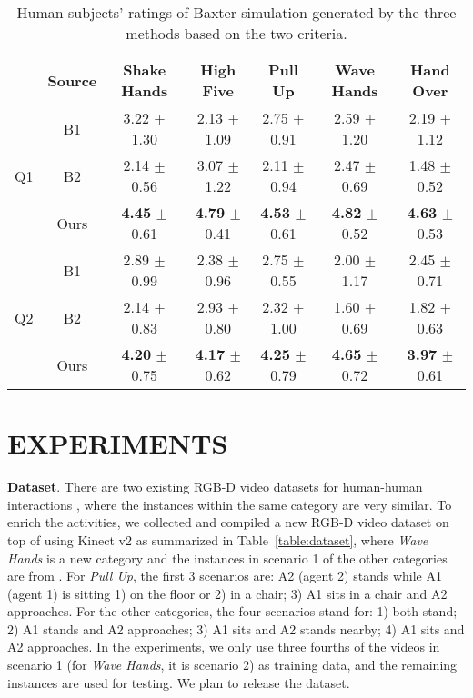 \documentclass[letterpaper, 10 pt, conference]{ieeeconf}  %
\begin{document}
\begin{table}[t!]\scriptsize
\caption{Human subjects' ratings of Baxter simulation generated by the three methods based on the two criteria.}
\label{table:ratings}
\vspace{-5pt}
\centering
\tabcolsep=0.08cm
\begin{tabular}{c|c|c|c|c|c|c} \hline
 & Source   & Shake Hands & High Five & Pull Up & Wave Hands & Hand Over \\ \hline
\multirow{3}{*}{Q1} & B1 & 3.22 $\pm$ 1.30 &  2.13 $\pm$ 1.09 & 2.75 $\pm$ 0.91 &  2.59 $\pm$ 1.20 & 2.19 $\pm$ 1.12    \\ \cline{2-7}
 & B2 & 2.14 $\pm$ 0.56 &  3.07 $\pm$ 1.22  & 2.11 $\pm$ 0.94 &  2.47 $\pm$ 0.69 & 1.48 $\pm$ 0.52   \\ \cline{2-7}
  & Ours & \textbf{4.45} $\pm$ 0.61 & \textbf{4.79} $\pm$ 0.41 & \textbf{4.53} $\pm$ 0.61 &  \textbf{4.82} $\pm$ 0.52 & \textbf{4.63} $\pm$ 0.53   \\ \hline
\multirow{3}{*}{Q2}  & B1 & 2.89 $\pm$ 0.99 &  2.38 $\pm$ 0.96  & 2.75 $\pm$ 0.55 &  2.00 $\pm$ 1.17 & 2.45 $\pm$ 0.71 \\ \cline{2-7}
 & B2 & 2.14 $\pm$ 0.83 & 2.93 $\pm$ 0.80 & 2.32 $\pm$ 1.00 & 1.60 $\pm$ 0.69 & 1.82 $\pm$ 0.63 \\ \cline{2-7}
  & Ours  & \textbf{4.20} $\pm$ 0.75 & \textbf{4.17} $\pm$ 0.62 & \textbf{4.25} $\pm$ 0.79 &  \textbf{4.65} $\pm$ 0.72 &   \textbf{3.97} $\pm$ 0.61   \\ \hline
\end{tabular}
\vspace{-5pt}
\end{table}


\section{EXPERIMENTS}

\textbf{Dataset}. There are two existing RGB-D video datasets for human-human interactions \cite{Yun2012, Shuijcai2016}, where the instances within the same category are very similar. To enrich the activities, we collected and compiled a new RGB-D video dataset on top of \cite{Shuijcai2016} using Kinect v2 as summarized in Table~\ref{table:dataset}, where \textit{Wave Hands} is a new category and the instances in scenario 1 of the other categories are from \cite{Shuijcai2016}. For \textit{Pull Up}, the first 3 scenarios are: A2 (agent 2) stands while A1 (agent 1) is sitting 1) on the floor or 2) in a chair; 3) A1 sits in a chair and A2 approaches. For the other categories, the four scenarios stand for: 1) both stand; 2) A1 stands and A2 approaches; 3) A1 sits and A2 stands nearby; 4) A1 sits and A2 approaches. In the experiments, we only use three fourths of the videos in scenario 1 (for \textit{Wave Hands}, it is scenario 2) as training data, and the remaining instances are used for testing. We plan to release the dataset.
\end{document}
